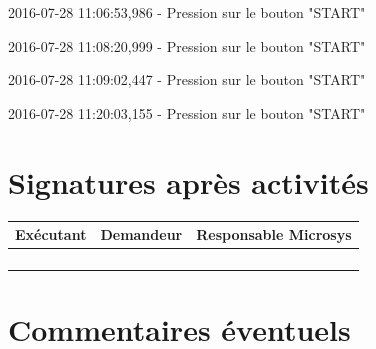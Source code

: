 \documentclass[a4paper, 11pt]{article}
\begin{document}
2016-07-28 11\string:06\string:53,986 - Pression sur le bouton "START"

2016-07-28 11\string:08\string:20,999 - Pression sur le bouton "START"

2016-07-28 11\string:09\string:02,447 - Pression sur le bouton "START"

2016-07-28 11\string:20\string:03,155 - Pression sur le bouton "START"

\section{Signatures après activités}

\begin{center}
	\begin{tabular}{|c|c|c|}
        \hline
        Exécutant & Demandeur & Responsable Microsys \\
        \hline
         \hspace{4.5cm} & \hspace{4.5cm} & \hspace{4.5cm} \\
        &&\\
        &&\\
        &&\\
        \hline
	\end{tabular}
\end{center}

\section{Commentaires éventuels}
\end{document}
